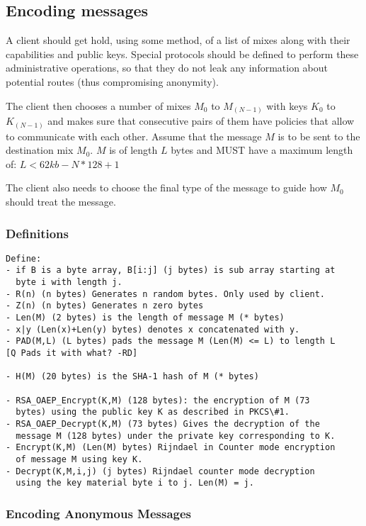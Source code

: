\documentclass{article}
\begin{document}
\subsection{Encoding messages}

A client should get hold, using some method, of a list of mixes along with 
their capabilities and public keys. Special protocols should be defined to 
perform these administrative operations, so that they do not leak any 
information about potential routes (thus compromising anonymity).

The client then chooses a number of mixes $M_0$ to $M_(N-1)$ with keys
$K_0$ to $K_(N-1)$ and makes sure that consecutive pairs of them have
policies that allow to communicate with each other. Assume that the
message $M$ is to be sent to the destination mix $M_0$. $M$ is of length $L$
bytes and MUST have a maximum length of: \( L < 62kb - N*128 + 1 \)

The client also needs to choose the final type of the message to guide
how $M_0$ should treat the message.

\subsubsection{Definitions}

\begin{verbatim}
Define:
- if B is a byte array, B[i:j] (j bytes) is sub array starting at 
  byte i with length j.
- R(n) (n bytes) Generates n random bytes. Only used by client.
- Z(n) (n bytes) Generates n zero bytes
- Len(M) (2 bytes) is the length of message M (* bytes)
- x|y (Len(x)+Len(y) bytes) denotes x concatenated with y.
- PAD(M,L) (L bytes) pads the message M (Len(M) <= L) to length L
[Q Pads it with what? -RD]

- H(M) (20 bytes) is the SHA-1 hash of M (* bytes)

- RSA_OAEP_Encrypt(K,M) (128 bytes): the encryption of M (73
  bytes) using the public key K as described in PKCS\#1.
- RSA_OAEP_Decrypt(K,M) (73 bytes) Gives the decryption of the
  message M (128 bytes) under the private key corresponding to K.
- Encrypt(K,M) (Len(M) bytes) Rijndael in Counter mode encryption 
  of message M using key K. 
- Decrypt(K,M,i,j) (j bytes) Rijndael counter mode decryption 
  using the key material byte i to j. Len(M) = j.
\end{verbatim}

\subsubsection{Encoding Anonymous Messages}
\end{document}
